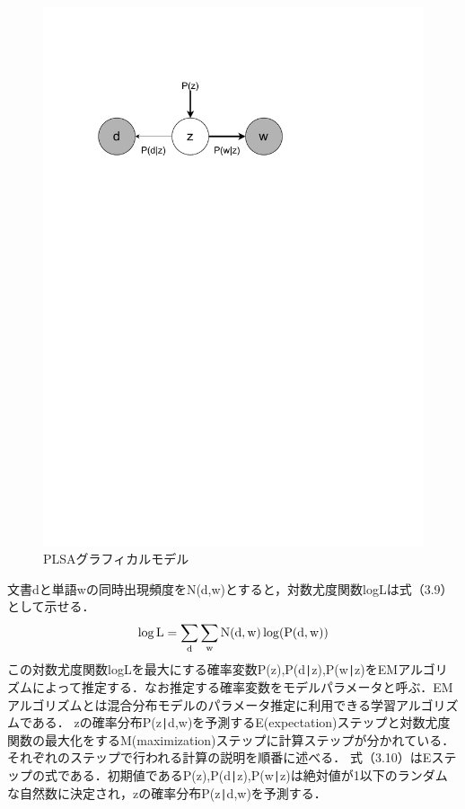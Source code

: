 \begin{figure}[h]
  \centering
  \includegraphics[width=12cm]{PLSA_graphical.pdf}
  \vspace{-1mm}
  \caption{PLSAグラフィカルモデル}
  \label{fig:vkall}
  \vspace{5mm}
\end{figure}
文書dと単語wの同時出現頻度をN(d,w)とすると，対数尤度関数logLは式（3.9）として示せる．
\begin{equation}
\begin{split}
\rm{\log L= \sum_d\sum_wN(d,w)\log(P(d,w))}
\end{split}
\end{equation}
この対数尤度関数logLを最大にする確率変数P(z),P(d\verb+|+z),P(w\verb+|+z)をEMアルゴリズムによって推定する．なお推定する確率変数をモデルパラメータと呼ぶ．EMアルゴリズムとは混合分布モデルのパラメータ推定に利用できる学習アルゴリズムである．
zの確率分布P(z\verb+|+d,w)を予測するE(expectation)ステップと対数尤度関数の最大化をするM(maximization)ステップに計算ステップが分かれている．それぞれのステップで行われる計算の説明を順番に述べる．
式（3.10）はEステップの式である．初期値であるP(z),P(d\verb+|+z),P(w\verb+|+z)は絶対値が1以下のランダムな自然数に決定され，zの確率分布P(z\verb+|+d,w)を予測する．

